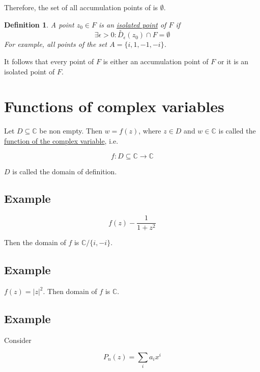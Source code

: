 \documentclass{article}
\newtheorem{definition}[theorem]{Definition}
\newtheorem{one minute paper}[theorem]{One Minute Paper}
\begin{document}
Therefore, the set of all accumulation points of is $\emptyset$.

\begin{definition}
    A point $z_0 \in F$ is an \underline{isolated point} of $F$ if $$\exists \epsilon > 0: \overset{\circ}{D}_{\epsilon}(z_0) \cap F = \emptyset$$
    For example, all points of the set $A= \{i, 1, -1, -i\}$. 
\end{definition}

It follows that every point of $F$ is either an accumulation point of $F$ or it is an isolated point of $F$. 

\section*{Functions of complex variables}

Let $D \subseteq \mathbb{C}$ be non empty. Then $w = f(z)$, where $z \in D$ and $w \in \mathbb{C}$ is called the \underline{function of the complex variable}, i.e. 

\begin{equation}
    f: D \subseteq \mathbb{C} \rightarrow \mathbb{C}
\end{equation}

$D$ is called the domain of definition. 

\subsection*{Example}

\begin{equation}
    f(z) - \frac{1}{1 + z^2}
\end{equation}

Then the domain of $f$ is $\mathbb{C}/\{i, -i\}$.

\subsection*{Example}

$f(z) = |z|^2$. Then domain of $f$ is $\mathbb{C}$. 

\subsection*{Example}

Consider 

\begin{equation}
    P_n(z) = \sum_i a_i x^i
\end{equation}
\end{document}
